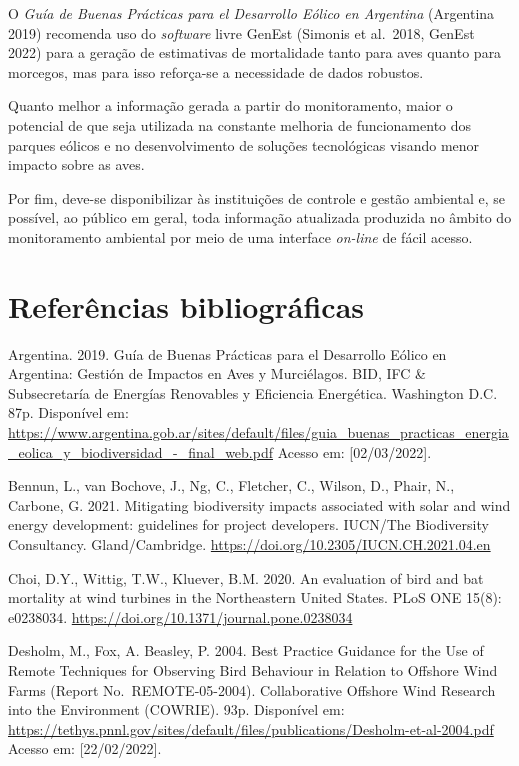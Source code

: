 \documentclass[
  oneside]{scrbook}
\begin{document}
O \emph{Guía de Buenas Prácticas para el Desarrollo Eólico en Argentina} (Argentina 2019) recomenda uso do \emph{software} livre GenEst (Simonis et al.~2018, GenEst 2022) para a geração de estimativas de mortalidade tanto para aves quanto para morcegos, mas para isso reforça-se a necessidade de dados robustos.

Quanto melhor a informação gerada a partir do monitoramento, maior o potencial de que seja utilizada na constante melhoria de funcionamento dos parques eólicos e no desenvolvimento de soluções tecnológicas visando menor impacto sobre as aves.

Por fim, deve-se disponibilizar às instituições de controle e gestão ambiental e, se possível, ao público em geral, toda informação atualizada produzida no âmbito do monitoramento ambiental por meio de uma interface \emph{on-line} de fácil acesso.

\hypertarget{referuxeancias-bibliogruxe1ficas-5}{%
\section{Referências bibliográficas}\label{referuxeancias-bibliogruxe1ficas-5}}

Argentina. 2019. Guía de Buenas Prácticas para el Desarrollo Eólico en Argentina: Gestión de Impactos en Aves y Murciélagos. BID, IFC \& Subsecretaría de Energías Renovables y Eficiencia Energética. Washington D.C. 87p. Disponível em: \url{https://www.argentina.gob.ar/sites/default/files/guia_buenas_practicas_energia_eolica_y_biodiversidad_-_final_web.pdf} Acesso em: {[}02/03/2022{]}.

Bennun, L., van Bochove, J., Ng, C., Fletcher, C., Wilson, D., Phair, N., Carbone, G. 2021. Mitigating biodiversity impacts associated with solar and wind energy development: guidelines for project developers. IUCN/The Biodiversity Consultancy. Gland/Cambridge. \url{https://doi.org/10.2305/IUCN.CH.2021.04.en}

Choi, D.Y., Wittig, T.W., Kluever, B.M. 2020. An evaluation of bird and bat mortality at wind turbines in the Northeastern United States. PLoS ONE 15(8): e0238034. \url{https://doi.org/10.1371/journal.pone.0238034}

Desholm, M., Fox, A. Beasley, P. 2004. Best Practice Guidance for the Use of Remote Techniques for Observing Bird Behaviour in Relation to Offshore Wind Farms (Report No.~REMOTE-05-2004). Collaborative Offshore Wind Research into the Environment (COWRIE). 93p. Disponível em: \url{https://tethys.pnnl.gov/sites/default/files/publications/Desholm-et-al-2004.pdf} Acesso em: {[}22/02/2022{]}.
\end{document}
